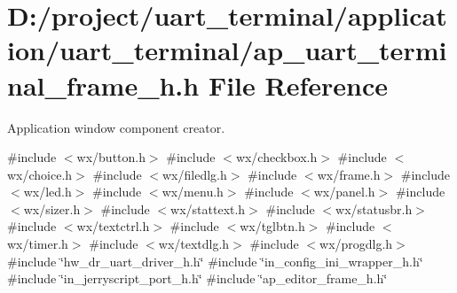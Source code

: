 \section{D\+:/project/uart\+\_\+terminal/application/uart\+\_\+terminal/ap\+\_\+uart\+\_\+terminal\+\_\+frame\+\_\+h.h File Reference}
\label{ap__uart__terminal__frame__h_8h}


Application window component creator.  


{\ttfamily \#include $<$wx/button.\+h$>$}\newline
{\ttfamily \#include $<$wx/checkbox.\+h$>$}\newline
{\ttfamily \#include $<$wx/choice.\+h$>$}\newline
{\ttfamily \#include $<$wx/filedlg.\+h$>$}\newline
{\ttfamily \#include $<$wx/frame.\+h$>$}\newline
{\ttfamily \#include $<$wx/led.\+h$>$}\newline
{\ttfamily \#include $<$wx/menu.\+h$>$}\newline
{\ttfamily \#include $<$wx/panel.\+h$>$}\newline
{\ttfamily \#include $<$wx/sizer.\+h$>$}\newline
{\ttfamily \#include $<$wx/stattext.\+h$>$}\newline
{\ttfamily \#include $<$wx/statusbr.\+h$>$}\newline
{\ttfamily \#include $<$wx/textctrl.\+h$>$}\newline
{\ttfamily \#include $<$wx/tglbtn.\+h$>$}\newline
{\ttfamily \#include $<$wx/timer.\+h$>$}\newline
{\ttfamily \#include $<$wx/textdlg.\+h$>$}\newline
{\ttfamily \#include $<$wx/progdlg.\+h$>$}\newline
{\ttfamily \#include \char`\"{}hw\+\_\+dr\+\_\+uart\+\_\+driver\+\_\+h.\+h\char`\"{}}\newline
{\ttfamily \#include \char`\"{}in\+\_\+config\+\_\+ini\+\_\+wrapper\+\_\+h.\+h\char`\"{}}\newline
{\ttfamily \#include \char`\"{}in\+\_\+jerryscript\+\_\+port\+\_\+h.\+h\char`\"{}}\newline
{\ttfamily \#include \char`\"{}ap\+\_\+editor\+\_\+frame\+\_\+h.\+h\char`\"{}}\newline
